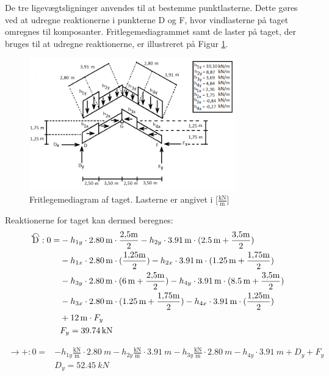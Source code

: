 De tre ligevægtsligninger anvendes til at bestemme punktlasterne. Dette gøres ved at udregne reaktionerne i punkterne D og F, hvor vindlasterne på taget omregnes til komposanter. Fritlegemediagrammet samt de laster på taget, der bruges til at udregne reaktionerne, er illustreret på Figur \ref{fig:fld}. 

\begin{figure}[htbp]
	\centering
	\includegraphics[width=0.8\textwidth]{billeder/fldtag.png}
	\caption{Fritlegemediagram af taget. Lasterne er angivet i [$\frac{\text{kN}}{\text{m}}$]}
	\label{fig:fld}
\end{figure}

Reaktionerne for taget kan dermed beregnes:
\begin{equation}
	\begin{split}
	\ALN{\text{D}}: 0 = &-h_{1y} \cdot \SI{2,80}{m} \cdot \frac{2,\!5 \text{m}}{2} - h_{2y} \cdot \SI{3,91}{m} \cdot (\SI{2,5}{m} + \frac{3,\!5 \text{m}}{2}) \\ & - h_{1x} \cdot \SI{2,80}{m} \cdot (\frac{1,\!25 \text{m}}{2}) - h_{2x} \cdot \SI{3,91}{m} \cdot (\SI{1,25}{m} + \frac{1,\!75 \text{m}}{2}) \\ & - h_{3y} \cdot \SI{2,80}{m} \cdot (\SI{6}{m} + \frac{2,\!5 \text{m}}{2}) - h_{4y} \cdot \SI{3,91}{m} \cdot (\SI{8,5}{m} + \frac{3,\!5 \text{m}}{2}) \\ & - h_{3x} \cdot \SI{2,80}{m} \cdot (\SI{1,25}{m} + \frac{1,\!75 \text{m}}{2}) - h_{4x} \cdot \SI{3,91}{m} \cdot (\frac{1,\!25 \text{m}}{2}) \\ & + \SI{12}{m} \cdot F_y
	\\ &
	F_y = \SI{39,74}{kN}
	\end{split}
\end{equation}

\begin{equation}
\begin{split}
	\rightarrow+: 0 = & -h_{1y} \frac{\text{kN}}{\text{m}} \cdot \SI{2,80}{m} - h_{2y} \frac{\text{kN}}{\text{m}} \cdot \SI{3,91}{m} - h_{3y} \frac{\text{kN}}{\text{m}} \cdot \SI{2,80}{m} -  h_{4y} \cdot \SI{3,91}{m} + D_y + F_y 
	\\ &
	D_y = \SI{52,45}{kN}
\end{split}
\end{equation}

